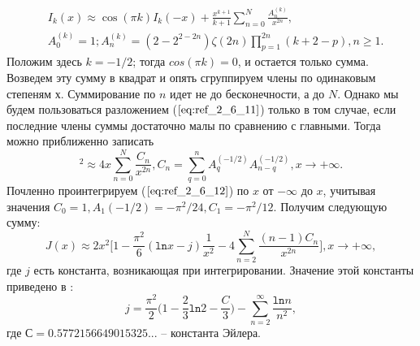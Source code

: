\begin{equation}
\begin{aligned}
&I_k(x) \approx \cos (\pi k) I_k(-x) + \frac{x^{k+1}}{k+1} \sum\limits_{n=0}^N \frac{A_n^{(k)}}{x^{2n}}, \\
&A_0^{(k)} = 1; A_n^{(k)} = (2-2^{2-2n}) \zeta(2n) \prod\limits_{p=1}^{2n} (k+2-p), n \geqslant 1.
\end{aligned}
\label{eq:ref_2_6_11}
\end{equation}
Положим здесь $k = -1/2$; тогда $cos(\pi k) = 0$, и остается только сумма. Возведем
эту сумму в квадрат и опять сгруппируем члены по одинаковым степеням $х$.
Суммирование по $n$ идет не до бесконечности, а до $N$. Однако мы будем
пользоваться разложением ($\ref{eq:ref_2_6_11}$) только в том случае, если последние члены
суммы достаточно малы по сравнению с главными. Тогда можно приближенно
записать
\begin{equation}
[I_{-1/2}(x)]^2 \approx 4x \sum\limits_{n=0}^{N} \frac{C_n}{x^{2n}}, C_n = \sum\limits_{q=0}^{n} A_q^{(-1/2)} A_{n-q}^{(-1/2)}, x \to +\infty.
\label{eq:ref_2_6_12}
\end{equation}
Почленно проинтегрируем ($\ref{eq:ref_2_6_12}$) по $x$ от $-\infty$ до $x$, учитывая значения
$C_0=1, A_1(-1/2)=-\pi^2/24, C_1=-\pi^2/12$. Получим следующую сумму:
\begin{equation}
J(x) \approx 2x^2 \Bigg[ 1 - \frac{\pi^2}{6} (\texttt{ln}x - j)\frac{1}{x^2} - 4 \sum\limits_{n=2}^{N} \frac{(n-1)C_n}{x^{2n}} \Bigg], x \to +\infty,
\label{eq:ref_2_6_13}
\end{equation}
где $j$ есть константа, возникающая при интегрировании. Значение этой
константы приведено в \cite{Kalitkin_Kuzmina_Preprint,Kuzmina_Disser}:
\begin{equation}
j = \frac{\pi^2}{2} \Bigg(1 - \frac{2}{3} \texttt{ln}2 - \frac{C}{3} \Bigg) - \sum\limits_{n=2}^{\infty} \frac{\texttt{ln}n}{n^2},
\label{eq:ref_2_6_14}
\end{equation}
где $С = 0.5772156649015325...$ – константа Эйлера.

